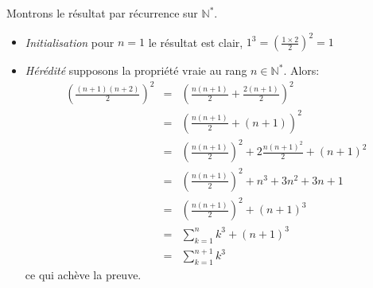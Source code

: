 Montrons le résultat par récurrence sur $\mathbb{N}^*$.
\begin{itemize}
  \item \textit{Initialisation} pour $n=1$ le résultat est clair, $1^3=\left(\frac{1\times 2}{2}\right)^2=1$
  \item \textit{Hérédité} supposons la propriété vraie au rang $n\in\mathbb{N}^*$. Alors:
  \begin{eqnarray*}
    \left( \frac{(n+1)(n+2)}{2} \right)^2 &=& \left( \frac{n(n+1)}{2} + \frac{2(n+1)}{2}  \right)^2 \\
    &=& \left( \frac{n(n+1)}{2} + (n+1) \right)^2 \\
    &=& \left( \frac{n(n+1)}{2} \right)^2 + 2\frac{n(n+1)^2}{2} + (n+1)^2 \\
    &=& \left( \frac{n(n+1)}{2} \right)^2 + n^3+3n^2+3n+1 \\
    &=& \left( \frac{n(n+1)}{2} \right)^2 + (n+1)^3 \\
    &=&  \sum_{k=1}^n{k^3} + (n+1)^3  \\
    &=&  \sum_{k=1}^{n+1}{k^3} 
  \end{eqnarray*}
  ce qui achève la preuve.
\end{itemize}
